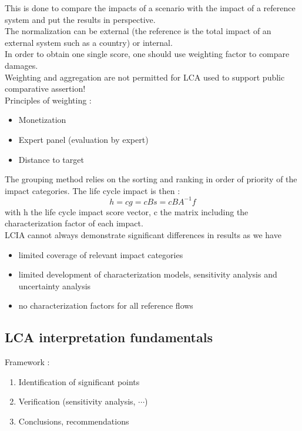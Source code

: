 \documentclass[../main.tex]{subfiles}
\begin{document}
This is done to compare the impacts of a scenario with the impact of a reference system and put the results in perspective.\\
The normalization can be external (the reference is the total impact of an external system such as a country) or internal. \\
In order to obtain one single score, one should use weighting factor to compare damages. \\

\warning Weighting and aggregation are not permitted for LCA used to support public comparative assertion!\\

Principles of weighting : \begin{itemize}
    \item Monetization
    \item Expert panel (evaluation by expert)
    \item Distance to target 
\end{itemize}

The grouping method relies on the sorting and ranking in order of priority of the impact categories. 
The life cycle impact is then : \begin{equation}
    h =cg = cBs= cBA^{-1}f
\end{equation}
with h the life cycle impact score vector, c the matrix including the characterization factor of each impact. \\
LCIA cannot always demonstrate significant differences in results as we have \begin{itemize}
    \item limited coverage of relevant impact categories
    \item limited development of characterization models, sensitivity analysis and uncertainty analysis
    \item no characterization factors for all reference flows
\end{itemize}

\subsection{LCA interpretation fundamentals}
Framework : \begin{enumerate}
    \item Identification of significant points
    \item Verification (sensitivity analysis, $\cdots$)
    \item Conclusions, recommendations
\end{enumerate}
\end{document}
